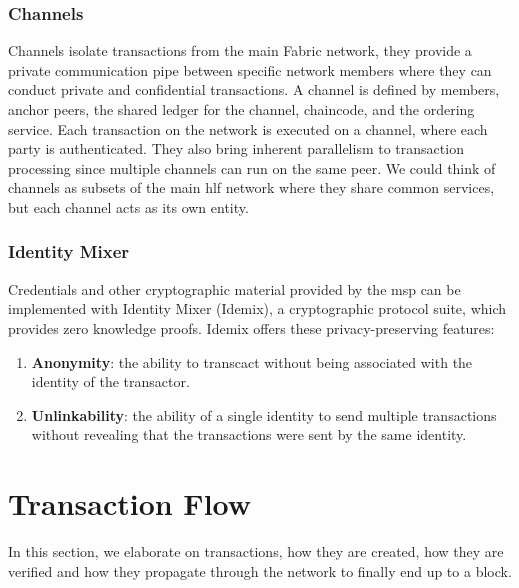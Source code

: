 \subsubsection{Channels}
Channels isolate transactions from the main Fabric network, they provide a private communication pipe between specific network members where they can conduct private and confidential transactions. A channel is defined by members, anchor peers, the shared ledger for the channel, chaincode, and the ordering service. Each transaction on the network is executed on a channel, where each party is authenticated. They also bring inherent parallelism to transaction processing since multiple channels can run on the same peer. We could think of channels as subsets of the main \acrshort{hlf} network where they share common services, but each channel acts as its own entity. 

\subsubsection{Identity Mixer}
Credentials and other cryptographic material provided by the \acrshort{msp} can be implemented with Identity Mixer (Idemix), a cryptographic protocol suite, which provides zero knowledge proofs. Idemix offers these privacy-preserving features:
\begin{enumerate}
    \item \textbf{Anonymity}: the ability to transcact without being associated with the identity of the transactor.
    \item \textbf{Unlinkability}: the ability of a single identity to send multiple transactions without revealing that the transactions were sent by the same identity. 
\end{enumerate}

\section{Transaction Flow}
In this section, we elaborate on transactions, how they are created, how they are verified and how they propagate through the network to finally end up to a block.
